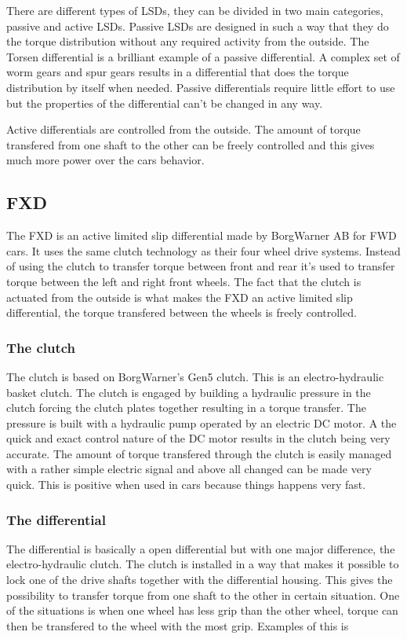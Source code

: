 There are different types of LSDs, they can be divided in two main categories, passive and active LSDs. Passive LSDs are designed in such a way that they do the torque distribution without any required activity from the outside. The Torsen differential is a brilliant example of a passive differential. A complex set of worm gears and spur gears results in a differential that does the torque distribution by itself when needed. Passive differentials require little effort to use but the properties of the differential can't be changed in any way.

Active differentials are controlled from the outside. The amount of torque transfered from one shaft to the other can be freely controlled and this gives much more power over the cars behavior.

\subsection{FXD}
The FXD is an active limited slip differential made by BorgWarner AB for FWD cars. It uses the same clutch technology as their four wheel drive systems. Instead of using the clutch to transfer torque between front and rear it's used to transfer torque between the left and right front wheels. The fact that the clutch is actuated from the outside is what makes the FXD an active limited slip differential, the torque transfered between the wheels is freely controlled.

\subsubsection{The clutch}
The clutch is based on BorgWarner's Gen5 clutch. This is an electro-hydraulic basket clutch. The clutch is engaged by building a hydraulic pressure in the clutch forcing the clutch plates together resulting in a torque transfer. The pressure is built with a hydraulic pump operated by an electric DC motor. A the quick and exact control nature of the DC motor results in the clutch being very accurate. The amount of torque transfered through the clutch is easily managed with a rather simple electric signal and above all changed can be made very quick. This is positive when used in cars because things happens very fast.

\subsubsection{The differential}
The differential is basically a open differential but with one major difference, the electro-hydraulic clutch. The clutch is installed in a way that makes it possible to lock one of the drive shafts together with the differential housing. This gives the possibility to transfer torque from one shaft to the other in certain situation. One of the situations is when one wheel has less grip than the other wheel, torque can then be transfered to the wheel with the most grip. Examples of this is 

